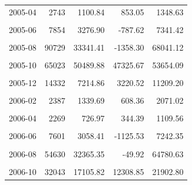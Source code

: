 \begin{longtable}[t]{crrrr}
2005-04 & 2743 & 1100.84 & 853.05 & 1348.63\\
\cellcolor{gray!10}{2005-05} & \cellcolor{gray!10}{5075} & \cellcolor{gray!10}{2574.46} & \cellcolor{gray!10}{1963.01} & \cellcolor{gray!10}{3185.91}\\
2005-06 & 7854 & 3276.90 & -787.62 & 7341.42\\
\cellcolor{gray!10}{2005-07} & \cellcolor{gray!10}{30238} & \cellcolor{gray!10}{16838.53} & \cellcolor{gray!10}{12223.69} & \cellcolor{gray!10}{21453.37}\\
2005-08 & 90729 & 33341.41 & -1358.30 & 68041.12\\
\cellcolor{gray!10}{2005-09} & \cellcolor{gray!10}{102455} & \cellcolor{gray!10}{59976.22} & \cellcolor{gray!10}{50275.74} & \cellcolor{gray!10}{69676.71}\\
2005-10 & 65023 & 50489.88 & 47325.67 & 53654.09\\
\cellcolor{gray!10}{2005-11} & \cellcolor{gray!10}{31631} & \cellcolor{gray!10}{20179.08} & \cellcolor{gray!10}{11092.31} & \cellcolor{gray!10}{29265.86}\\
2005-12 & 14332 & 7214.86 & 3220.52 & 11209.20\\
\cellcolor{gray!10}{2006-01} & \cellcolor{gray!10}{4531} & \cellcolor{gray!10}{2161.56} & \cellcolor{gray!10}{1390.76} & \cellcolor{gray!10}{2932.36}\\
2006-02 & 2387 & 1339.69 & 608.36 & 2071.02\\
\cellcolor{gray!10}{2006-03} & \cellcolor{gray!10}{2426} & \cellcolor{gray!10}{967.24} & \cellcolor{gray!10}{230.38} & \cellcolor{gray!10}{1704.10}\\
2006-04 & 2269 & 726.97 & 344.39 & 1109.56\\
\cellcolor{gray!10}{2006-05} & \cellcolor{gray!10}{4313} & \cellcolor{gray!10}{1771.57} & \cellcolor{gray!10}{845.19} & \cellcolor{gray!10}{2697.95}\\
2006-06 & 7601 & 3058.41 & -1125.53 & 7242.35\\
\cellcolor{gray!10}{2006-07} & \cellcolor{gray!10}{17788} & \cellcolor{gray!10}{8174.62} & \cellcolor{gray!10}{3364.56} & \cellcolor{gray!10}{12984.68}\\
2006-08 & 54630 & 32365.35 & -49.92 & 64780.63\\
\cellcolor{gray!10}{2006-09} & \cellcolor{gray!10}{76475} & \cellcolor{gray!10}{43327.62} & \cellcolor{gray!10}{26475.56} & \cellcolor{gray!10}{60179.67}\\
2006-10 & 32043 & 17105.82 & 12308.85 & 21902.80\\

\end{longtable}

